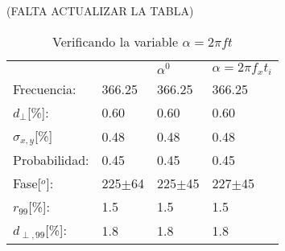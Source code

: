 (FALTA ACTUALIZAR LA TABLA)
\begin{table}[H]
    \begin{small}
        \begin{center}
            \begin{tabular}[c]{l|l|l|l}
                                    & \cite{Aab_2020} & $\alpha^0$   & $\alpha=2\pi f_xt_i$   \\ 
                Frecuencia:         & 366.25          &  366.25      &  366.25            \\
                $d_\perp$[\%]:      & 0.60            &  0.60        &  0.60              \\
                $\sigma_{x,y}$[\%]  & 0.48            &  0.48        &  0.48              \\ 
                Probabilidad:       & 0.45            &  0.45        &  0.45              \\
                Fase[$^o$]:         & 225$\pm$64\cite{discrepancia} & 225$\pm$45   &  227$\pm$45          \\
                $r_{99}$[\%]:       & 1.5             &  1.5       &  1.5             \\
                $d_{\perp,99}$[\%]: & 1.8             &  1.8       &  1.8             \\
            \end{tabular}
        \end{center}
        \caption{Verificando la  variable $\alpha=2\pi ft$}
        \label{tab:comp_vars}
    \end{small}
\end{table}

